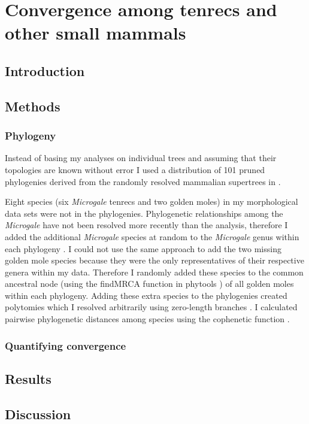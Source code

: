\chapter{Convergence among tenrecs and other small mammals}
\label{chap:convergence}


\section{Introduction}

\section{Methods}


\subsection{Phylogeny} %
	Instead of basing my analyses on individual trees and assuming that their topologies are known without error \citep[e.g.][]{Ruta2013, Foth2012, Brusatte2008, Harmon2003} I used a distribution of 101 pruned phylogenies derived from the randomly resolved mammalian supertrees in \citep{Kuhn2011}. 

	Eight species (six \textit{Microgale} tenrecs and two golden moles) in my morphological data sets were not in the phylogenies. Phylogenetic relationships among the \textit{Microgale} have not been resolved more recently than the \citep{Kuhn2011} analysis, therefore I added the additional \textit{Microgale} species at random to the \textit{Microgale} genus within each phylogeny \citep{Revell2012}. I could not use the same approach to add the two missing golden mole species because they were the only representatives of their respective genera within my data. Therefore I randomly added these species to the common ancestral node (using the findMRCA function in phytools \citep{Revell2012}) of all golden moles within each phylogeny. Adding these extra species to the phylogenies created polytomies which I resolved arbitrarily using zero-length branches \citep{Paradis2004}. I calculated pairwise phylogenetic distances among species using the cophenetic function \citep{Team2014}. 

\subsection{Quantifying convergence}


\section{Results}

\section{Discussion}